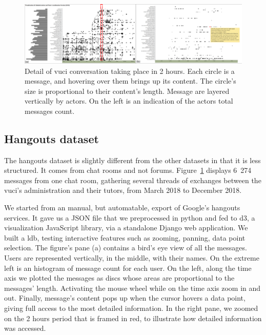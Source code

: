 \documentclass[a4paper,twoside]{article}
\begin{document}
\begin{figure}[t]
  \centering
  \includegraphics[width=\textwidth]{images/uvci_paysage_flou}
  \small{
    \caption{\label{fig:hgconv}
      Detail of \gls{vuci} conversation taking place in 2 hours.  Each circle is a message, and hovering over them brings up its content.  The circle's size is proportional to their content's length.  Message are layered vertically by actors.  On the left is an indication of the actors total messages count.
    }}
\end{figure}

\subsection{Hangouts dataset}

The hangouts dataset is slightly different from the other datasets in that it is less structured.  It comes from chat rooms and not forums.  Figure~\ref{fig:hgconv} displays 6~274 messages from one chat room, gathering several threads of exchanges between the \gls{vuci}'s administration and their tutors, from March 2018 to December 2018.

We started from an manual, but automatable, export of Google's hangouts services.  It gave us a JSON file that we preprocessed in python and fed to d3, a visualization JavaScript library, via a standalone Django web application.  We built a \gls{ldb}, testing interactive features such as zooming, panning, data point selection.
The figure's pane (a) contains a bird's eye view of all the messages.  Users are represented vertically, in the middle,  with their names.  On the extreme left is an histogram of message count for each user. On the left, along the time axis we plotted the messages as discs whose areas are proportional to the messages' length. Activating the mouse wheel while on the time axis zoom in and out.  Finally, message's content pops up when the cursor hovers a data point, giving full access to the most detailed information.  In the right pane, we zoomed on the 2 hours period that is framed in red, to illustrate how detailed information was accessed.
\end{document}
